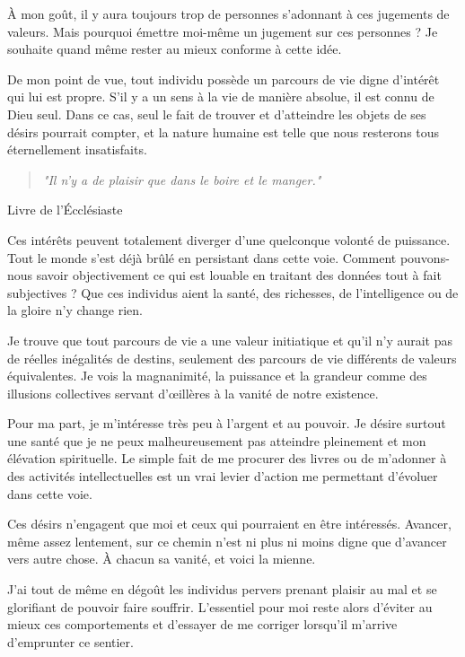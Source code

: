 À mon goût, il y aura toujours trop de personnes s’adonnant à ces jugements de valeurs. Mais pourquoi émettre moi-même un jugement sur ces personnes ? Je souhaite quand même rester au mieux conforme à cette idée.

De mon point de vue, tout individu possède un parcours de vie digne d’intérêt qui lui est propre. S'il y a un sens à la vie de manière absolue, il est connu de Dieu seul. Dans ce cas, seul le fait de trouver et d’atteindre les objets de ses désirs pourrait compter, et la nature humaine est telle que nous resterons tous éternellement insatisfaits.
\begin{center}
\begin{quote}
\textit{"Il n'y a de plaisir que dans le boire et le manger."}
\end{quote} Livre de l'\'Ecclésiaste
\end{center}

Ces intérêts peuvent totalement diverger d’une quelconque volonté de puissance. Tout le monde s’est déjà brûlé en persistant dans cette voie. Comment pouvons-nous savoir objectivement ce qui est louable en traitant des données tout à fait subjectives ?
Que ces individus aient la santé, des richesses, de l'intelligence ou de la gloire
n’y change rien.

Je trouve que tout parcours de vie a une valeur initiatique et qu'il n'y aurait pas de réelles inégalités de destins, seulement des parcours de vie différents de valeurs équivalentes. Je vois la magnanimité, la puissance et la grandeur comme des illusions collectives servant d'œillères à la vanité de notre existence.

Pour ma part, je m’intéresse très peu à l’argent et au pouvoir. Je désire surtout une santé que je ne peux malheureusement pas atteindre pleinement et mon élévation spirituelle. Le simple fait de me procurer des livres ou de m'adonner à des activités intellectuelles est un vrai levier d’action me permettant d’évoluer dans cette voie.

Ces désirs n’engagent que moi et ceux qui pourraient en être intéressés. Avancer, même assez lentement, sur ce chemin n’est ni plus ni moins digne que d’avancer vers autre chose. À chacun sa vanité, et voici la mienne.

J’ai tout de même en dégoût les individus pervers prenant plaisir au mal et se glorifiant de pouvoir faire souffrir. L’essentiel pour moi reste alors d’éviter au mieux ces comportements et d’essayer de me corriger lorsqu’il m’arrive d’emprunter ce sentier.


